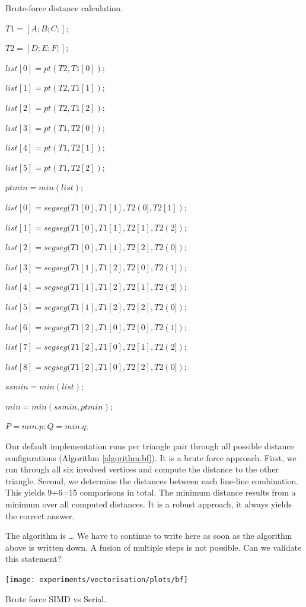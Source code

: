 \begin{algorithm}
 \caption{Brute-force distance calculation.} \label{algorithm:bf}
 \begin{algorithmic}[1]
	
		\State $T1=[A;B;C;];$
		
		\State $T2=[D;E;F;];$

		\State $list[0]= pt(T2, T1[0]);$

		\State $list[1]= pt(T2, T1[1]);$

		\State $list[2]= pt(T2, T1[2]);$

		\State $list[3]= pt(T1, T2[0]);$

		\State $list[4]= pt(T1, T2[1]);$

		\State $list[5]= pt(T1, T2[2]);$

		\State $ptmin = min(list);$

		\State $list[0]=segseg(T1[0],T1[1],T2(0],T2[1]);$

		\State $list[1]=segseg(T1[0],T1[1],T2[1],T2(2]);$

		\State $list[2]=segseg(T1[0],T1[1],T2[2],T2(0]);$

		\State $list[3]=segseg(T1[1],T1[2],T2[0],T2(1]);$

		\State $list[4]=segseg(T1[1],T1[2],T2[1],T2(2]);$

		\State $list[5]=segseg(T1[1],T1[2],T2[2],T2(0]);$

		\State $list[6]=segseg(T1[2],T1[0],T2[0],T2(1]);$

		\State $list[7]=segseg(T1[2],T1[0],T2[1],T2(2]);$

		\State $list[8]=segseg(T1[2],T1[0],T2[2],T2(0]);$

		\State $ssmin = min(list);$

		\State $min = min(ssmin, ptmin);$

		\State $P = min.p; Q = min.q;$
	\EndFunction
 \end{algorithmic}
\end{algorithm} 


%
%
Our default implementation runs per triangle pair through all possible distance
configurations (Algorithm \ref{algorithm:bf}).
It is a brute force approach.
First, we run through all six involved vertices and compute the distance to the
other triangle.
Second, we determine the distances between each line-line combination.
This yields 9+6=15 comparisons in total.
The minimum distance results from a minimum over all computed distances.
It is a robust approach, it always yields the correct answer.


%
%
The algorithm is \ldots
We have to continue to write here as soon as the algorithm above is written
down.
A fusion of multiple steps is not possible. Can we validate this statement?

%
%
\texttt{[image: experiments/vectorisation/plots/bf]} \protect\caption{\label{fig17}Brute force SIMD vs Serial.}

